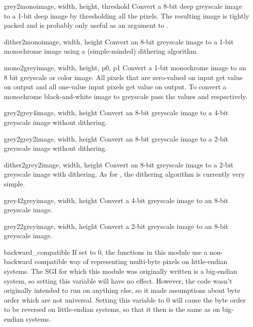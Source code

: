 \begin{funcdesc}{grey2mono}{image, width, height, threshold}
Convert a 8-bit deep greyscale image to a 1-bit deep image by
thresholding all the pixels.  The resulting image is tightly packed and
is probably only useful as an argument to .
\end{funcdesc}

\begin{funcdesc}{dither2mono}{image, width, height}
Convert an 8-bit greyscale image to a 1-bit monochrome image using a
(simple-minded) dithering algorithm.
\end{funcdesc}

\begin{funcdesc}{mono2grey}{image, width, height, p0, p1}
Convert a 1-bit monochrome image to an 8 bit greyscale or color image.
All pixels that are zero-valued on input get value  on output
and all one-value input pixels get value  on output.  To
convert a monochrome black-and-white image to greyscale pass the
values  and  respectively.
\end{funcdesc}

\begin{funcdesc}{grey2grey4}{image, width, height}
Convert an 8-bit greyscale image to a 4-bit greyscale image without
dithering.
\end{funcdesc}

\begin{funcdesc}{grey2grey2}{image, width, height}
Convert an 8-bit greyscale image to a 2-bit greyscale image without
dithering.
\end{funcdesc}

\begin{funcdesc}{dither2grey2}{image, width, height}
Convert an 8-bit greyscale image to a 2-bit greyscale image with
dithering.  As for , the dithering algorithm
is currently very simple.
\end{funcdesc}

\begin{funcdesc}{grey42grey}{image, width, height}
Convert a 4-bit greyscale image to an 8-bit greyscale image.
\end{funcdesc}

\begin{funcdesc}{grey22grey}{image, width, height}
Convert a 2-bit greyscale image to an 8-bit greyscale image.
\end{funcdesc}

\begin{datadesc}{backward_compatible}
If set to 0, the functions in this module use a non-backward
compatible way of representing multi-byte pixels on little-endian
systems.  The SGI for which this module was originally written is a
big-endian system, so setting this variable will have no effect.
However, the code wasn't originally intended to run on anything else,
so it made assumptions about byte order which are not universal.
Setting this variable to 0 will cause the byte order to be reversed on
little-endian systems, so that it then is the same as on big-endian
systems.
\end{datadesc}
